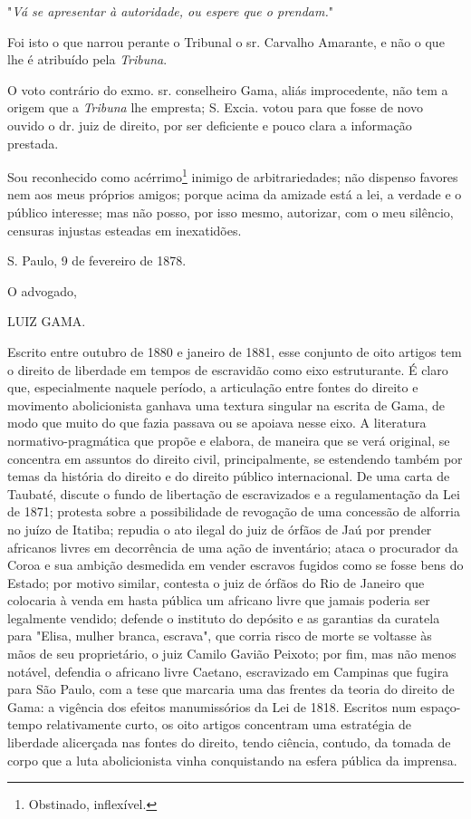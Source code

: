 "\emph{Vá se apresentar à autoridade, ou espere que o prendam.}"

Foi isto o que narrou perante o Tribunal o sr. Carvalho Amarante, e não
o que lhe é atribuído pela \emph{Tribuna}.

O voto contrário do exmo. sr. conselheiro Gama, aliás improcedente, não
tem a origem que a \emph{Tribuna} lhe empresta; S. Excia. votou para que
fosse de novo ouvido o dr. juiz de direito, por ser deficiente e pouco
clara a informação prestada.

Sou reconhecido como acérrimo\footnote{Obstinado, inflexível.}
inimigo de arbitrariedades;
não dispenso favores nem aos meus próprios amigos; porque acima da
amizade está a lei, a verdade e o público interesse; mas não posso, por
isso mesmo, autorizar, com o meu silêncio, censuras injustas esteadas em
inexatidões.

S. Paulo, 9 de fevereiro de 1878.

O advogado,

LUIZ GAMA.

\pagebreak
\mbox{}\vfill
\thispagestyle{empty}

{\small\noindent
Escrito entre outubro de 1880 e janeiro de 1881, esse conjunto de
oito artigos tem o direito de liberdade em tempos de escravidão como
eixo estruturante. É claro que, especialmente naquele período, a
articulação entre fontes do direito e movimento abolicionista ganhava
uma textura singular na escrita de Gama, de modo que muito do que fazia
passava ou se apoiava nesse eixo. A literatura normativo-pragmática que
propõe e elabora, de maneira que se verá original, se concentra em
assuntos do direito civil, principalmente, se estendendo também por
temas da história do direito e do direito público internacional. De uma
carta de Taubaté, discute o fundo de libertação de escravizados e a
regulamentação da Lei de 1871; protesta sobre a possibilidade de
revogação de uma concessão de alforria no juízo de Itatiba; repudia o
ato ilegal do juiz de órfãos de Jaú por prender africanos livres em
decorrência de uma ação de inventário; ataca o procurador da Coroa e sua
ambição desmedida em vender escravos fugidos como se fosse bens do
Estado; por motivo similar, contesta o juiz de órfãos do Rio de Janeiro
que colocaria à venda em hasta pública um africano livre que jamais
poderia ser legalmente vendido; defende o instituto do depósito e as
garantias da curatela para "Elisa, mulher branca, escrava", que corria
risco de morte se voltasse às mãos de seu proprietário, o juiz Camilo
Gavião Peixoto; por fim, mas não menos notável, defendia o africano
livre Caetano, escravizado em Campinas que fugira para São Paulo, com a
tese que marcaria uma das frentes da teoria do direito de Gama: a
vigência dos efeitos manumissórios da Lei de 1818. Escritos num
espaço-tempo relativamente curto, os oito artigos concentram uma
estratégia de liberdade alicerçada nas fontes do direito, tendo ciência,
contudo, da tomada de corpo que a luta abolicionista vinha conquistando
na esfera pública da imprensa.}


